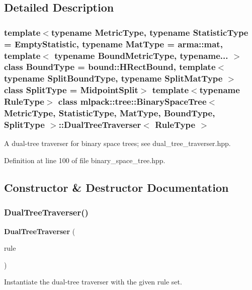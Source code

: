\subsection{Detailed Description}
\subsubsection*{template$<$typename Metric\+Type, typename Statistic\+Type = Empty\+Statistic, typename Mat\+Type = arma\+::mat, template$<$ typename Bound\+Metric\+Type, typename... $>$ class Bound\+Type = bound\+::\+H\+Rect\+Bound, template$<$ typename Split\+Bound\+Type, typename Split\+Mat\+Type $>$ class Split\+Type = Midpoint\+Split$>$\newline
template$<$typename Rule\+Type$>$\newline
class mlpack\+::tree\+::\+Binary\+Space\+Tree$<$ Metric\+Type, Statistic\+Type, Mat\+Type, Bound\+Type, Split\+Type $>$\+::\+Dual\+Tree\+Traverser$<$ Rule\+Type $>$}

A dual-\/tree traverser for binary space trees; see dual\+\_\+tree\+\_\+traverser.\+hpp. 

Definition at line 100 of file binary\+\_\+space\+\_\+tree.\+hpp.



\subsection{Constructor \& Destructor Documentation}
\mbox{\label{classmlpack_1_1tree_1_1BinarySpaceTree_1_1DualTreeTraverser_abd4227fd4d7e7f3e1090233443cc265e}} 
\subsubsection{Dual\+Tree\+Traverser()}
{\footnotesize\ttfamily \textbf{ Dual\+Tree\+Traverser} (\begin{DoxyParamCaption}\item[{Rule\+Type \&}]{rule }\end{DoxyParamCaption})}



Instantiate the dual-\/tree traverser with the given rule set. 



